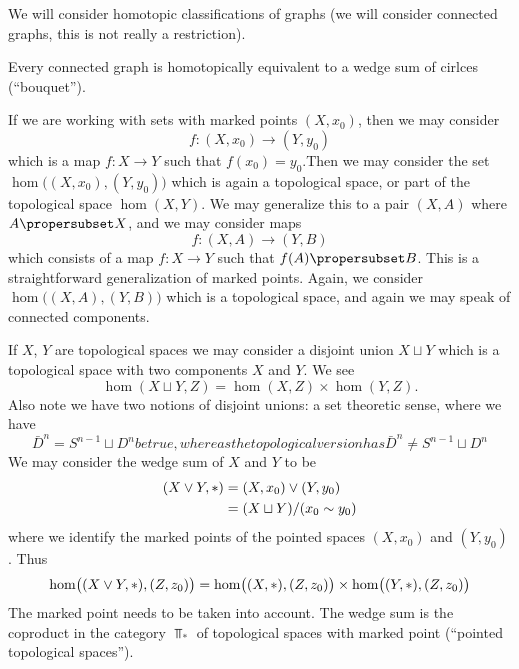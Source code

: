 We will consider homotopic classifications of graphs (we will
consider connected graphs, this is not really a restriction).

\begin{thm}\label{thm:bouquet}
Every connected graph is homotopically equivalent to a wedge sum
of cirlces (``bouquet'').
\end{thm}
If we are working with sets with marked points $(X,x_0)$, then we
may consider
\begin{equation}
f\colon (X,x_0)\to (Y,y_0)
\end{equation}
which is a map $f\colon X\to Y$ such that $f(x_0)=y_0$.Then we
may consider the set $\hom\bigl((X,x_0),(Y,y_0)\bigr)$ which is
again a topological space, or part of the topological space
$\hom(X,Y)$. We may generalize this to a pair $(X,A)$ where
$A\propersubset X$, and we may consider maps
\begin{equation}
f\colon (X,A)\to (Y,B)
\end{equation}
which consists of a map $f\colon X\to Y$ such that
$f(A)\propersubset B$. This is a straightforward generalization
of marked points. Again, we consider
$\hom\bigl((X,A),(Y,B)\bigr)$
which is a topological space, and again we may speak of connected
components. 

If $X$, $Y$ are topological spaces we may consider a disjoint
union $X\sqcup Y$ which is a topological space with two
components $X$ and $Y$. We see
\begin{equation}
\hom(X\sqcup Y,Z)=\hom(X,Z)\times\hom(Y,Z).
\end{equation}
Also note we have two notions of disjoint unions: a set
theoretic
sense, where we have
\begin{subequations}
\begin{equation}
\bar{D}^{n}=S^{n-1}\sqcup D^{n}
\end{equation}
be true, whereas the topological version has
\begin{equation}
\bar{D}^{n}\not=S^{n-1}\sqcup D^{n}
\end{equation}
\end{subequations}
%
We may consider the wedge sum of $X$ and $Y$ to be
\begin{equation}
\begin{split}
(X\vee Y,*)&=(X,x_0)\vee (Y,y_0) \\
&= (X\sqcup Y)/(x_{0}\sim y_{0})
\end{split}
\end{equation}
where we identify the marked points of the pointed spaces
$(X,x_0)$ and $(Y,y_0)$. Thus
\begin{equation}
\hom\bigl((X\vee Y,*),(Z,z_0)\bigr) = 
\hom\bigl((X,*),(Z,z_0)\bigr)\times
\hom\bigl((Y,*),(Z,z_0)\bigr)
\end{equation}
The marked point needs to be taken into account. The wedge sum is
the coproduct in the category $\Top_{*}$ of topological spaces
with marked point (``pointed topological spaces'').

